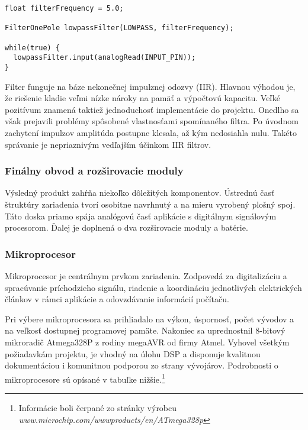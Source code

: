 \documentclass[titlepage,12pt]{article}
\begin{document}
\begin{lstlisting}
float filterFrequency = 5.0; 

FilterOnePole lowpassFilter(LOWPASS, filterFrequency);

while(true) {
  lowpassFilter.input(analogRead(INPUT_PIN));
}
\end{lstlisting}

Filter funguje na báze nekonečnej impulznej odozvy (IIR). Hlavnou výhodou je, že riešenie kladie veľmi nízke nároky na pamäť a výpočtovú kapacitu. Veľké pozitívum znamená taktiež jednoduchosť implementácie do projektu. Onedlho sa však prejavili problémy spôsobené vlastnosťami spomínaného filtra. Po úvodnom zachytení impulzov amplitúda postupne klesala, až kým nedosiahla nulu. Takéto správanie je nepriaznivým vedľajším účinkom IIR filtrov. 

\newpage
\subsubsection{Finálny obvod a rozširovacie moduly}
Výsledný produkt zahŕňa niekoľko dôležitých komponentov. Ústrednú časť štruktúry zariadenia tvorí osobitne navrhnutý a na mieru vyrobený plošný spoj. Táto doska priamo spája analógovú časť aplikácie s digitálnym signálovým procesorom. Ďalej je doplnená o dva rozširovacie \linebreak moduly a batérie.

\subsubsection*{Mikroprocesor}
Mikroprocesor je centrálnym prvkom zariadenia. Zodpovedá za digitalizáciu a spracúvanie príchodzieho signálu, riadenie a koordináciu jednotlivých elektrických článkov v rámci aplikácie a odovzdávanie informácií počítaču.

Pri výbere mikroprocesora sa prihliadalo na výkon, úspornosť, počet vývodov a na veľkosť dostupnej programovej pamäte. Nakoniec sa uprednostnil 8-bitový mikroradič Atmega328P z rodiny megaAVR od firmy Atmel. Vyhovel všetkým požiadavkám projektu, je vhodný na úlohu DSP a disponuje kvalitnou dokumentáciou i komunitnou podporou zo strany vývojárov. 
Podrobnosti o mikroprocesore sú opísané v tabuľke nižšie.\footnote{Informácie boli čerpané zo stránky výrobcu \textit{www.microchip.com/wwwproducts/en/ATmega328p}}
\end{document}
